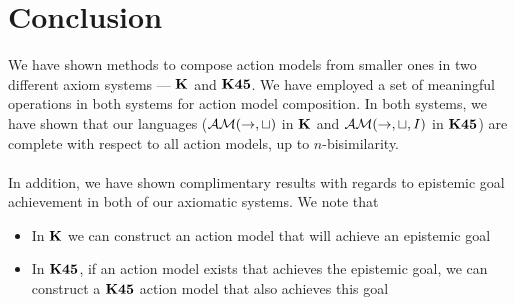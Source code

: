 \chapter{Conclusion}

We have shown methods to compose action models from smaller ones in two different axiom systems --- $\bf K$
and $\bf K45$.
We have employed a set of meaningful operations in both systems for action model composition.
In both systems, we have shown that our languages ($\mathcal{AM}(\to,\sqcup)$ in $\bf K$ and
$\mathcal{AM}(\to,\sqcup,I)$ in $\bf K45$) are complete with respect to all action models, up to
$n$-bisimilarity.\\
\\
In addition, we have shown complimentary results with regards to epistemic goal achievement in both
of our axiomatic systems.
We note that
\begin{itemize}
	\item In $\bf K$ we can construct an action model that will achieve an epistemic goal
	\item In $\bf K45$, if an action model exists that achieves the epistemic goal, we can construct a
		$\bf K45$ action model that also achieves this goal
\end{itemize}

